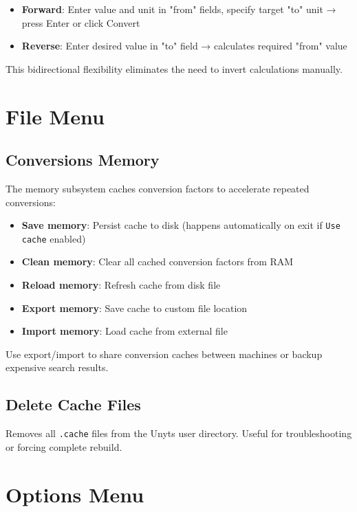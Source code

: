 \documentclass[11pt,a4paper]{report}
\begin{document}
\begin{itemize}
\item \textbf{Forward}: Enter value and unit in "from" fields, specify target "to" unit → press Enter or click Convert
\item \textbf{Reverse}: Enter desired value in "to" field → calculates required "from" value
\end{itemize}

This bidirectional flexibility eliminates the need to invert calculations manually.

\section{File Menu}

\subsection{Conversions Memory}

The memory subsystem caches conversion factors to accelerate repeated conversions:

\begin{itemize}
\item \textbf{Save memory}: Persist cache to disk (happens automatically on exit if \texttt{Use cache} enabled)
\item \textbf{Clean memory}: Clear all cached conversion factors from RAM
\item \textbf{Reload memory}: Refresh cache from disk file
\item \textbf{Export memory}: Save cache to custom file location
\item \textbf{Import memory}: Load cache from external file
\end{itemize}

Use export/import to share conversion caches between machines or backup expensive search results.

\subsection{Delete Cache Files}

Removes all \texttt{.cache} files from the Unyts user directory. Useful for troubleshooting or forcing complete rebuild.

\section{Options Menu}
\end{document}
